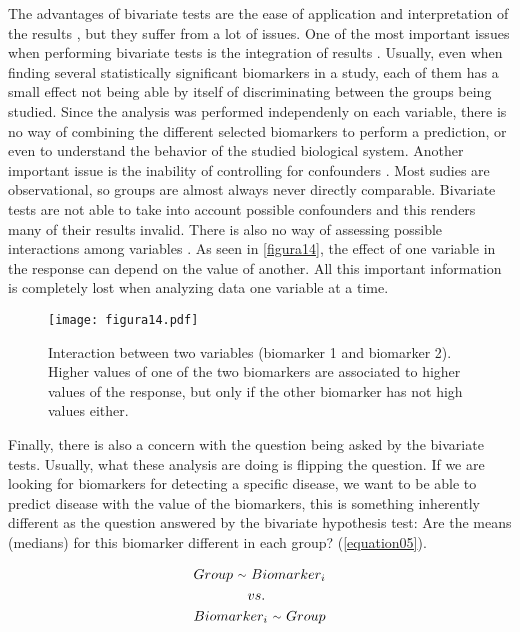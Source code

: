 The advantages of bivariate tests are the ease of application and interpretation of the results \parencite{vetter2018unadjusted}, but they suffer from a lot of issues. One of the most important issues when performing bivariate tests is the integration of results \parencite{katz2011multivariable}. Usually, even when finding several statistically significant biomarkers in a study, each of them has a small effect not being able by itself of discriminating between the groups being studied. Since the analysis was performed independenly on each variable, there is no way of combining the different selected biomarkers to perform a prediction, or even to understand the behavior of the studied biological system. Another important issue is the inability of controlling for confounders \parencite{heinze2017five}. Most sudies are observational, so groups are almost always never directly comparable. Bivariate tests are not able to take into account possible confounders and this renders many of their results invalid. There is also no way of assessing possible interactions among variables \parencite{hassall2018beyond}. As seen in \autoref{figura14}, the effect of one variable in the response can depend on the value of another. All this important information is completely lost when analyzing data one variable at a time.

\begin{figure}[hbtp]
	\centering
\texttt{[image: figura14.pdf]}
\caption[Interaction between two variables]{Interaction between two variables (biomarker 1 and biomarker 2). Higher values of one of the two biomarkers are associated to higher values of the response, but only if the other biomarker has not high values either.}
\label{figura14}
\end{figure}

Finally, there is also a concern with the question being asked by the bivariate tests. Usually, what these analysis are doing is flipping the question. If we are looking for biomarkers for detecting a specific disease, we want to be able to predict disease with the value of the biomarkers, this is something inherently different as the question answered by the bivariate hypothesis test: Are the means (medians) for this biomarker different in each group? (\autoref{equation05}). 

\begin{equation}
\label{equation05}
\begin{split}
    Group\ {\raise.17ex\hbox{$\scriptstyle\sim$}}\ Biomarker_i \\
    vs. \phantom{MMMM}  \\
    Biomarker_i\ {\raise.17ex\hbox{$\scriptstyle\sim$}}\ Group
\end{split}
\end{equation}

